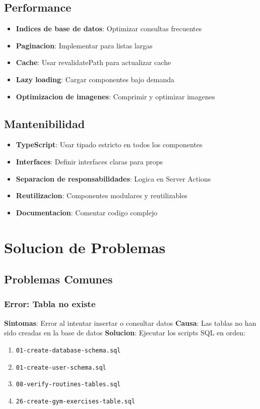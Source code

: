 \documentclass[12pt,a4paper]{article}
\begin{document}
\subsection{Performance}

\begin{itemize}
    \item \textbf{Indices de base de datos}: Optimizar consultas frecuentes
    \item \textbf{Paginacion}: Implementar para listas largas
    \item \textbf{Cache}: Usar revalidatePath para actualizar cache
    \item \textbf{Lazy loading}: Cargar componentes bajo demanda
    \item \textbf{Optimizacion de imagenes}: Comprimir y optimizar imagenes
\end{itemize}

\subsection{Mantenibilidad}

\begin{itemize}
    \item \textbf{TypeScript}: Usar tipado estricto en todos los componentes
    \item \textbf{Interfaces}: Definir interfaces claras para props
    \item \textbf{Separacion de responsabilidades}: Logica en Server Actions
    \item \textbf{Reutilizacion}: Componentes modulares y reutilizables
    \item \textbf{Documentacion}: Comentar codigo complejo
\end{itemize}

\section{Solucion de Problemas}

\subsection{Problemas Comunes}

\subsubsection{Error: Tabla no existe}

\textbf{Sintomas}: Error al intentar insertar o consultar datos
\textbf{Causa}: Las tablas no han sido creadas en la base de datos
\textbf{Solucion}: Ejecutar los scripts SQL en orden:
\begin{enumerate}
    \item \texttt{01-create-database-schema.sql}
    \item \texttt{01-create-user-schema.sql}
    \item \texttt{08-verify-routines-tables.sql}
    \item \texttt{26-create-gym-exercises-table.sql}
\end{enumerate}
\end{document}
